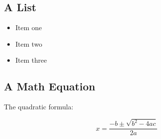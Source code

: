 \documentclass[
]{article}
\providecommand{\tightlist}{%
  \setlength{\itemsep}{0pt}\setlength{\parskip}{0pt}}
\begin{document}
\subsection{A List}\label{a-list}

\begin{itemize}
\tightlist
\item
  Item one
\item
  Item two
\item
  Item three
\end{itemize}

\subsection{A Math Equation}\label{a-math-equation}

The quadratic formula:

\[
x = \frac{-b \pm \sqrt{b^2 - 4ac}}{2a}
\]
\end{document}

